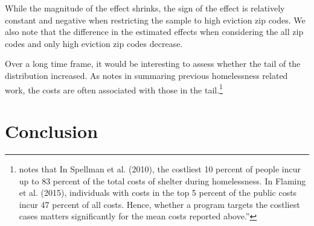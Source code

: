 \documentclass[a4paper,12pt]{article}
\begin{document}
While the magnitude of the effect shrinks, the sign of the effect is relatively constant and negative when restricting the sample to high eviction zip codes. We also note that the difference in the estimated effects when considering the all zip codes and only high eviction zip codes decrease. \par 
Over a long time frame, it would be interesting to assess whether the tail of the distribution increased. As \cite{evans2019reducing} notes in summaring previous homelessness related work, the costs are often associated with those in the tail.\footnote{\cite{evans2019reducing} notes that In Spellman et al. (2010), the costliest 10 percent of people incur up to 83 percent of the total costs of shelter
during homelessness. In Flaming et al. (2015), individuals with costs in the top 5 percent of the public costs
incur 47 percent of all costs. Hence, whether a program targets the costliest cases matters significantly for the
mean costs reported above.''}




 
\section{Conclusion}
\end{document}
